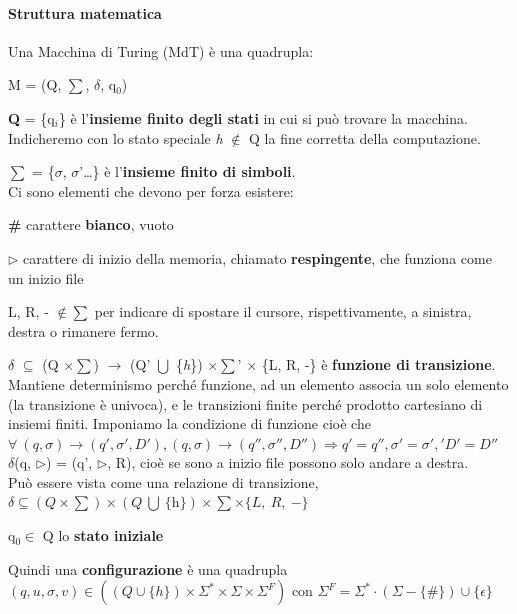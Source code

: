\documentclass[10pt]{book}
\begin{document}
\paragraph{Struttura matematica} Una Macchina di Turing (MdT) è una quadrupla:
\begin{center}
M = (Q, $\sum$, $\delta$, q$_0$)
\end{center}
\begin{list}{}{}
	\item \textbf{Q} = \{q$_i$\} è l'\textbf{insieme finito degli stati} in cui si può trovare la macchina.\\
	Indicheremo con lo stato speciale \textit{h} $\not\in$ Q la fine corretta della computazione.
	\item $\sum$ = \{$\sigma$, $\sigma$'\ldots\} è l'\textbf{insieme finito di simboli}.\\
	Ci sono elementi che devono per forza esistere:
	\begin{list}{}{}
		\item \textbf{\#} carattere \textbf{bianco}, vuoto
		\item $\triangleright$ carattere di inizio della memoria, chiamato \textbf{respingente}, che funziona come un inizio file
		\item L, R, - $\not\in\sum$ per indicare di spostare il cursore, rispettivamente, a sinistra, destra o rimanere fermo.
	\end{list}
	\item $\delta$ $\subseteq$ (Q $\times \sum$) $\rightarrow$ (Q' $\bigcup$ \{\textit{h}\}) $\times \sum$' $\times$ \{L, R, -\} è \textbf{funzione di transizione}.\\
	Mantiene determinismo perché funzione, ad un elemento associa un solo elemento (la transizione è univoca), e le transizioni finite perché prodotto cartesiano di insiemi finiti. Imponiamo la condizione di funzione cioè che $\forall\:(q, \sigma)\rightarrow (q', \sigma', D'), (q, \sigma)\rightarrow (q'', \sigma'', D'')\Rightarrow q'=q'', \sigma'=\sigma',' D'=D''$\\
$\delta$(q, $\triangleright$) = (q', $\triangleright$, R), cioè se sono a inizio file possono solo andare a destra.\\
Può essere vista come una relazione di transizione, $\delta \subseteq (Q \times \sum) \times (Q\:\bigcup\:\{\textit{h}\}) \times \sum \times \{L,\:R,\: -\}$
	\item q$_0 \in $ Q lo \textbf{stato iniziale} 
\end{list}
Quindi una \textbf{configurazione} è una quadrupla $(q, u, \sigma, v)\in((Q\cup\{h\})\times \Sigma^*\times\Sigma\times\Sigma^F)$ con $\Sigma^F = \Sigma^*\cdot(\Sigma - \{\#\})\cup\{\epsilon\}$\\
\end{document}
